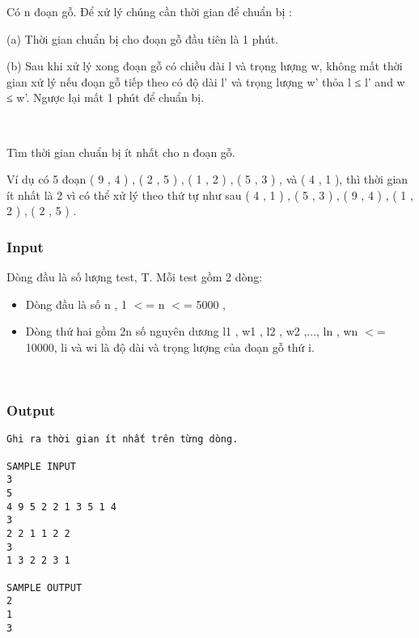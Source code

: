 

Có n đoạn gỗ. Để xử lý chúng cần thời gian để chuẩn bị :

(a) Thời gian chuẩn bị cho đoạn gỗ đầu tiên là 1 phút.

(b) Sau khi xử lý xong đoạn gỗ có chiều dài l và trọng lượng w, không mất thời gian xử lý nếu đoạn gỗ tiếp theo có độ dài l' và trọng lượng w' thỏa l ≤ l' and w ≤ w'. Ngược lại mất 1 phút để chuẩn bị.

 

Tìm thời gian chuẩn bị ít nhất cho n đoạn gỗ.

Ví dụ có 5 đoạn ( 9 , 4 ) , ( 2 , 5 ) , ( 1 , 2 ) , ( 5 , 3 ) , và ( 4 , 1 ), thì thời gian ít nhất là 2 vì có thể xử lý theo thứ tự như sau ( 4 , 1 ) , ( 5 , 3 ) , ( 9 , 4 ) , ( 1 , 2 ) , ( 2 , 5 ) .

\subsubsection{Input}

Dòng đầu là số lượng test, T. Mỗi test gồm 2 dòng:
\begin{itemize}
	\item Dòng đầu là số n , 1 $<$= n $<$= 5000 ,
	\item Dòng thứ hai gồm 2n số nguyên dương l1 , w1 , l2 , w2 ,..., ln , wn $<$= 10000, li và wi là độ dài và trọng lượng của đoạn gỗ thứ i. 
\end{itemize}

 

\subsubsection{Output}
\begin{verbatim}
Ghi ra thời gian ít nhất trên từng dòng.
​
SAMPLE INPUT
3 
5 
4 9 5 2 2 1 3 5 1 4 
3 
2 2 1 1 2 2 
3 
1 3 2 2 3 1

SAMPLE OUTPUT
2
1
3\end{verbatim}
